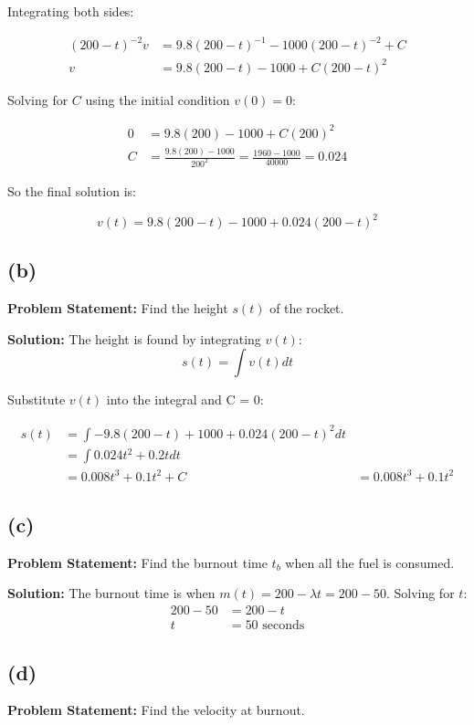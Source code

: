 \documentclass[12pt, letterpaper]{article}
\begin{document}
Integrating both sides:

\begin{align*}
(200-t)^{-2}v &= 9.8(200-t)^{-1} - 1000(200-t)^{-2} + C \\
v &= 9.8(200-t) - 1000 + C(200-t)^2
\end{align*}

Solving for $C$ using the initial condition $v(0) = 0$:

\begin{align*}
0 &= 9.8(200) - 1000 + C(200)^2 \\
C &= \frac{9.8(200)-1000}{200^2} = \frac{1960-1000}{40000} = 0.024
\end{align*}

So the final solution is:

\[
v(t) = 9.8(200-t) - 1000 + 0.024(200-t)^2
\]

\subsection*{(b)}
\textbf{Problem Statement:}
Find the height $s(t)$ of the rocket.

\textbf{Solution:}
The height is found by integrating $v(t)$:
\[
s(t) = \int v(t) dt
\]

Substitute $v(t)$ into the integral and C = 0:

\begin{align*}
s(t) &= \int -9.8(200-t) + 1000 + 0.024(200-t)^2 dt \\
&= \int 0.024t^2 + 0.2t dt \\
&= 0.008t^3 + 0.1t^2 + C
&= 0.008t^3 + 0.1t^2
\end{align*}


\subsection*{(c)}
\textbf{Problem Statement:}
Find the burnout time $t_b$ when all the fuel is consumed.

\textbf{Solution:}
The burnout time is when $m(t) = 200 - \lambda t = 200-50$. Solving for $t$:
\begin{align*}
200 - 50 &= 200 - t \\ 
t &= 50 \text{ seconds}
\end{align*}


\subsection*{(d)}
\textbf{Problem Statement:}
Find the velocity at burnout.
\end{document}

